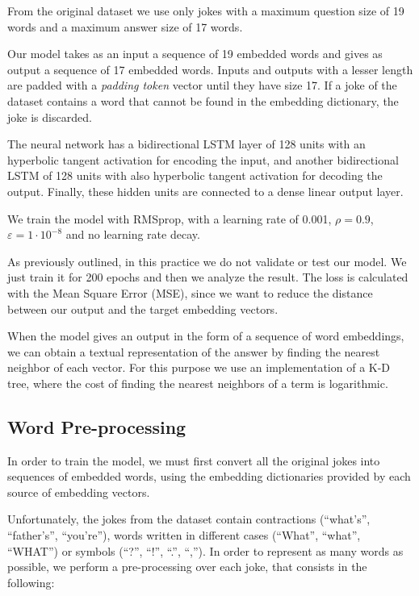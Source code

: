 \documentclass[]{article}
\begin{document}
	From the original dataset we use only jokes with a maximum question size of 19 words and a maximum answer size of 17 words.
	
	Our model takes as an input a sequence of 19 embedded words and gives as output a sequence of 17 embedded words. Inputs and outputs with a lesser length are padded with a \emph{padding token} vector until they have size 17. If a joke of the dataset contains a word that cannot be found in the embedding dictionary, the joke is discarded.
	
	The neural network has a bidirectional LSTM layer of 128 units with an hyperbolic tangent activation for encoding the input, and another bidirectional LSTM of 128 units with also hyperbolic tangent activation for decoding the output. Finally, these hidden units are connected to a dense linear output layer.
	
	We train the model with RMSprop, with a learning rate of 0.001, $ \rho = 0.9 $, $ \varepsilon = 1 \cdot 10^{-8} $ and no learning rate decay.
	
	As previously outlined, in this practice we do not validate or test our model. We just train it for 200 epochs and then we analyze the result. The loss is calculated with the Mean Square Error (MSE), since we want to reduce the distance between our output and the target embedding vectors.
	
	When the model gives an output in the form of a sequence of word embeddings, we can obtain a textual representation of the answer by finding the nearest neighbor of each vector. For this purpose we use an implementation of a K-D tree, where the cost of finding the nearest neighbors of a term is logarithmic.
	
	\subsection{Word Pre-processing}
	
	In order to train the model, we must first convert all the original jokes into sequences of embedded words, using the embedding dictionaries provided by each source of embedding vectors.
	
	Unfortunately, the jokes from the dataset contain contractions (``what's'', ``father's'', ``you're''), words written in different cases (``What'', ``what'', ``WHAT'') or symbols (``?'', ``!'', ``.'', ``,''). In order to represent as many words as possible, we perform a pre-processing over each joke, that consists in the following:
	
\end{document}
